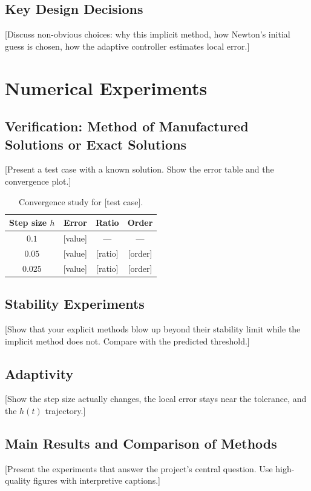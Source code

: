 \documentclass[11pt,a4paper]{article}
\theoremstyle{definition}
\theoremstyle{remark}
\begin{document}
\subsection{Key Design Decisions}
[Discuss non-obvious choices: why this implicit method, how Newton's initial
guess is chosen, how the adaptive controller estimates local error.]

\newpage
\section{Numerical Experiments}

\subsection{Verification: Method of Manufactured Solutions or Exact Solutions}
[Present a test case with a known solution. Show the error table and the
convergence plot.]

\begin{table}[H]
\centering
\begin{tabular}{cccc}
\toprule
\textbf{Step size $h$} & \textbf{Error} & \textbf{Ratio} & \textbf{Order} \\
\midrule
$0.1$    & [value] & ---  & ---  \\
$0.05$   & [value] & [ratio] & [order] \\
$0.025$  & [value] & [ratio] & [order] \\
\bottomrule
\end{tabular}
\caption{Convergence study for [test case].}
\end{table}

\subsection{Stability Experiments}
[Show that your explicit methods blow up beyond their stability limit while the
implicit method does not. Compare with the predicted threshold.]

\subsection{Adaptivity}
[Show the step size actually changes, the local error stays near the tolerance,
and the $h(t)$ trajectory.]

\subsection{Main Results and Comparison of Methods}
[Present the experiments that answer the project's central question. Use
high-quality figures with interpretive captions.]
\end{document}
